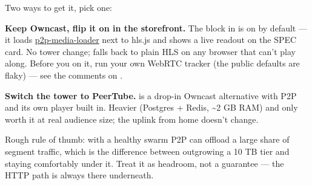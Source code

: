 \documentclass[fontpath=fonts/,logopath=logo/]{riposte-doc}
\begin{document}
Two ways to get it, pick one:

\begin{ripbullets}
\item \textbf{Keep Owncast, flip it on in the storefront.} The  block in  is on by default — it loads \href{https://github.com/novage/p2p-media-loader}{p2p-media-loader} next to hls.js and shows a live  readout on the SPEC card. No tower change; falls back to plain HLS on any browser that can't play along. Before you  on it, run your own WebRTC tracker (the public defaults are flaky) — see the comments on .
\item \textbf{Switch the tower to PeerTube.}  is a drop-in Owncast alternative with P2P and its own player built in. Heavier (Postgres + Redis, \textasciitilde{}2 GB RAM) and only worth it at real audience size; the uplink from home doesn't change.
\end{ripbullets}

Rough rule of thumb: with a healthy swarm P2P can offload a large share of segment traffic, which is the difference between outgrowing a 10 TB tier and staying comfortably under it. Treat it as headroom, not a guarantee — the HTTP path is always there underneath.

\ripend
\end{document}
